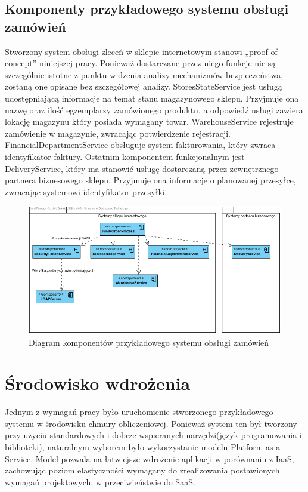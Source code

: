 	\subsection{Komponenty przykładowego systemu obsługi zamówień}	
		
		Stworzony system obsługi zleceń w sklepie internetowym stanowi „proof of concept” niniejszej pracy. Ponieważ dostarczane przez niego funkcje nie są szczególnie istotne z punktu widzenia analizy mechanizmów bezpieczeństwa, zostaną one opisane bez szczegółowej analizy. StoresStateService jest usługą udostępniającą informacje na temat stanu magazynowego sklepu. Przyjmuje ona nazwę oraz ilość egzemplarzy zamówionego produktu, a odpowiedź usługi zawiera lokację magazynu który posiada wymagany towar. WarehouseService rejestruje zamówienie w magazynie, zwracając potwierdzenie rejestracji. FinancialDepartmentService obsługuje system fakturowania, który zwraca identyfikator faktury. Ostatnim komponentem funkcjonalnym jest DeliveryService, który ma stanowić usługę dostarczaną przez zewnętrznego partnera biznesowego sklepu. Przyjmuje ona informacje o planowanej przesyłce, zwracając systemowi identyfikator przesyłki. 
		
		\begin{figure}[h]
			\centering
			\includegraphics[width=\textwidth]{img/KomponentySystemu.png}
			\caption{Diagram komponentów przykładowego systemu obsługi zamówień}
			\label{Komponenty}
		\end{figure}	
		

\section{Środowisko wdrożenia}
\label{sec:srodowiskoWdrozenia}

Jednym z wymagań pracy było uruchomienie stworzonego przykładowego systemu w środowisku chmury obliczeniowej. Ponieważ system ten był tworzony przy użyciu standardowych i dobrze wspieranych narzędzi(język programowania i biblioteki), naturalnym wyborem było wykorzystanie modelu Platform as a Service. Model pozwala na łatwiejsze wdrożenie aplikacji w porównaniu z IaaS, zachowując poziom elastyczności wymagany do zrealizowania postawionych wymagań projektowych, w przeciwieństwie do SaaS.

